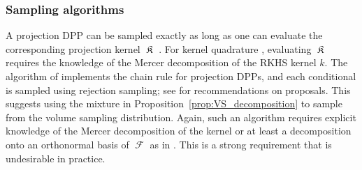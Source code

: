 \documentclass[twoside,11pt]{book}
\DeclareMathOperator*{\KDPP}{\mathfrak{K}}
\DeclareMathOperator{\F}{\mathcal{F}}
\begin{document}
\subsubsection{Sampling algorithms}


A projection DPP can be sampled exactly as long as one can evaluate the corresponding projection kernel $\KDPP$ \citep{HoKrPeVi06}. For kernel quadrature \citep{BeBaCh19}, evaluating $\KDPP$ requires the knowledge of the Mercer decomposition of the RKHS kernel $k$. The algorithm of \cite{HoKrPeVi06} implements the chain rule for projection DPPs, and each conditional is sampled using rejection sampling; see \cite{GaBaVa19} for recommendations on proposals. This suggests using the mixture in Proposition~\ref{prop:VS_decomposition} to sample from the volume sampling distribution.
Again, such an algorithm requires explicit knowledge of the Mercer decomposition of the kernel or at least a decomposition onto an orthonormal basis of $\F$ as in \citep{KaSaTa19}. This is a strong requirement that is undesirable in practice.
\end{document}
